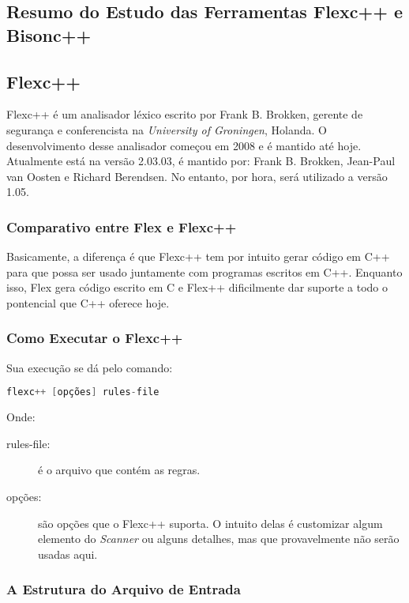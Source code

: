 \begin{apendicesenv}

\chapter{Resumo do Estudo das Ferramentas Flexc++ e Bisonc++}

\section{Flexc++}
Flexc++ é um analisador léxico escrito por Frank B. Brokken, gerente de segurança e conferencista na \textit{University of Groningen}, Holanda. O desenvolvimento desse analisador começou em 2008 e é mantido até hoje. Atualmente está na versão 2.03.03, é mantido por: Frank B. Brokken, Jean-Paul van Oosten e Richard Berendsen. No entanto, por hora, será utilizado a versão 1.05.

\subsection{Comparativo entre Flex e Flexc++}
\par
\indent Basicamente, a diferença é que Flexc++ tem por intuito gerar código em C++ para que possa ser usado juntamente com programas escritos em C++. Enquanto isso, Flex gera código escrito em C e Flex++ dificilmente dar suporte a todo o pontencial que C++ oferece hoje.

\subsection{Como Executar o Flexc++}

Sua execução se dá pelo comando:
\begin{lstlisting}[language=c, label=apendiceCodigoFlex1, caption=Comando para Execução do Flexc++]
 flexc++ [opções] rules-file
\end{lstlisting}

Onde:
\begin{description}
\item[rules-file:] é o arquivo que contém as regras.
\item[opções:] são opções que o Flexc++ suporta. O intuito delas é customizar algum elemento do \textit{Scanner} ou alguns detalhes, mas que provavelmente não serão usadas aqui. 
\end{description}

\subsection{A Estrutura do Arquivo de Entrada}


\end{apendicesenv}
